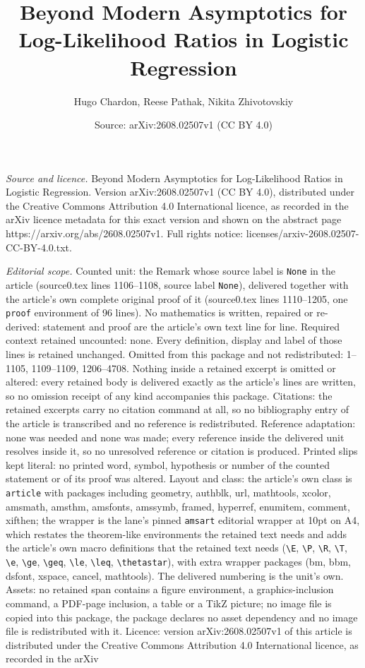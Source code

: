 \documentclass[10pt,a4paper]{amsart}
\title[Beyond Modern Asymptotics for Log-Likelihood Ratios in Logis]{Beyond Modern Asymptotics for Log-Likelihood Ratios in Logistic Regression}
\author{Hugo Chardon, Reese Pathak, Nikita Zhivotovskiy}
\date{Source: arXiv:2608.02507v1 (CC BY 4.0)}
\begin{document}
\maketitle

\noindent\emph{Source and licence.} Beyond Modern Asymptotics for Log-Likelihood Ratios in Logistic Regression. Version arXiv:2608.02507v1 (CC BY 4.0), distributed under the Creative Commons Attribution 4.0 International licence, as recorded in the arXiv licence metadata for this exact version and shown on the abstract page https://arxiv.org/abs/2608.02507v1. Full rights notice: licenses/arxiv-2608.02507-CC-BY-4.0.txt.\par\smallskip

\noindent\textit{Editorial scope.} Counted unit: the Remark whose source label is \texttt{None} in the article (source0.tex lines 1106--1108, source label \texttt{None}), delivered together with the article's own complete original proof of it (source0.tex lines 1110--1205, one \texttt{proof} environment of 96 lines). No mathematics is written, repaired or re-derived: statement and proof are the article's own text line for line. Required context retained uncounted: none. Every definition, display and label of those lines is retained unchanged. Omitted from this package and not redistributed: 1--1105, 1109--1109, 1206--4708. Nothing inside a retained excerpt is omitted or altered: every retained body is delivered exactly as the article's lines are written, so no omission receipt of any kind accompanies this package. Citations: the retained excerpts carry no citation command at all, so no bibliography entry of the article is transcribed and no reference is redistributed. Reference adaptation: none was needed and none was made; every reference inside the delivered unit resolves inside it, so no unresolved reference or citation is produced. Printed slips kept literal: no printed word, symbol, hypothesis or number of the counted statement or of its proof was altered. Layout and class: the article's own class is \texttt{article} with packages including geometry, authblk, url, mathtools, xcolor, amsmath, amsthm, amsfonts, amssymb, framed, hyperref, enumitem, comment, xifthen; the wrapper is the lane's pinned \texttt{amsart} editorial wrapper at 10pt on A4, which restates the theorem-like environments the retained text needs and adds the article's own macro definitions that the retained text needs (\texttt{\textbackslash E}, \texttt{\textbackslash P}, \texttt{\textbackslash R}, \texttt{\textbackslash T}, \texttt{\textbackslash e}, \texttt{\textbackslash ge}, \texttt{\textbackslash geq}, \texttt{\textbackslash le}, \texttt{\textbackslash leq}, \texttt{\textbackslash thetastar}), with extra wrapper packages (bm, bbm, dsfont, xspace, cancel, mathtools). The delivered numbering is the unit's own. Assets: no retained span contains a figure environment, a graphics-inclusion command, a PDF-page inclusion, a table or a TikZ picture; no image file is copied into this package, the package declares no asset dependency and no image file is redistributed with it. Licence: version arXiv:2608.02507v1 of this article is distributed under the Creative Commons Attribution 4.0 International licence, as recorded in the arXiv 
\end{document}

